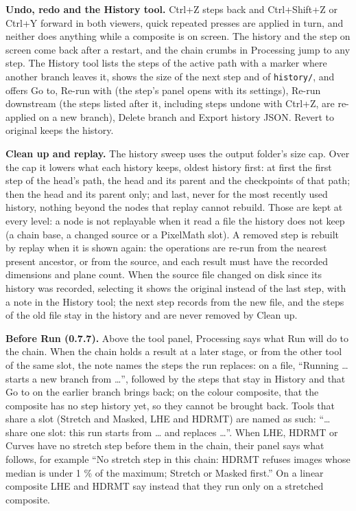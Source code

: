 \documentclass[11pt,a4paper]{article}
\newcommand{\code}[1]{\texttt{\small #1}}
\begin{document}
    \textbf{Undo, redo and the History tool.} Ctrl+Z steps back and Ctrl+Shift+Z or Ctrl+Y forward in both viewers, quick repeated presses are applied in turn, and neither does anything while a composite is on screen. The history and the step on screen come back after a restart, and the chain crumbs in Processing jump to any step. The History tool lists the steps of the active path with a marker where another branch leaves it, shows the size of the next step and of \code{history/}, and offers Go to, Re-run with (the step's panel opens with its settings), Re-run downstream (the steps listed after it, including steps undone with Ctrl+Z, are re-applied on a new branch), Delete branch and Export history JSON. Revert to original keeps the history.

    \textbf{Clean up and replay.} The history sweep uses the output folder's size cap. Over the cap it lowers what each history keeps, oldest history first: at first the first step of the head's path, the head and its parent and the checkpoints of that path; then the head and its parent only; and last, never for the most recently used history, nothing beyond the nodes that replay cannot rebuild. Those are kept at every level: a node is not replayable when it read a file the history does not keep (a chain base, a changed source or a PixelMath slot). A removed step is rebuilt by replay when it is shown again: the operations are re-run from the nearest present ancestor, or from the source, and each result must have the recorded dimensions and plane count. When the source file changed on disk since its history was recorded, selecting it shows the original instead of the last step, with a note in the History tool; the next step records from the new file, and the steps of the old file stay in the history and are never removed by Clean up.

    \textbf{Before Run (0.7.7).} Above the tool panel, Processing says what Run will do to the chain. When the chain holds a result at a later stage, or from the other tool of the same slot, the note names the steps the run replaces: on a file, ``Running \ldots{} starts a new branch from \ldots{}'', followed by the steps that stay in History and that Go to on the earlier branch brings back; on the colour composite, that the composite has no step history yet, so they cannot be brought back. Tools that share a slot (Stretch and Masked, LHE and HDRMT) are named as such: ``\ldots{} share one slot: this run starts from \ldots{} and replaces \ldots{}''. When LHE, HDRMT or Curves have no stretch step before them in the chain, their panel says what follows, for example ``No stretch step in this chain: HDRMT refuses images whose median is under 1 \% of the maximum; Stretch or Masked first.'' On a linear composite LHE and HDRMT say instead that they run only on a stretched composite.
\end{document}
